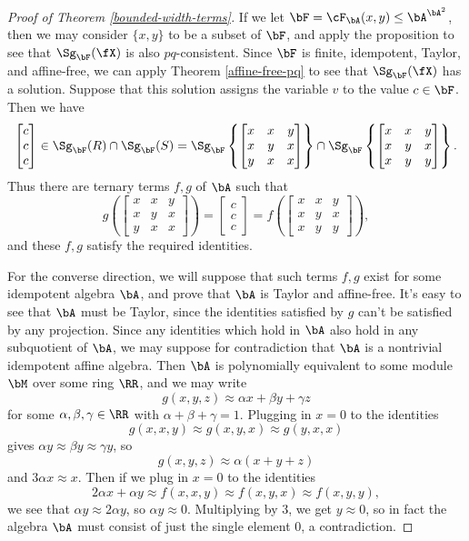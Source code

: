 \begin{proof}[Proof of Theorem \ref{bounded-width-terms}]
If we let $\bF = \cF_{\bA}(x,y) \le \bA^{\bA^2}$, then we may consider $\{x,y\}$ to be a subset of $\bF$, and apply the proposition to see that $\Sg_\bF(\fX)$ is also $pq$-consistent. Since $\bF$ is finite, idempotent, Taylor, and affine-free, we can apply Theorem \ref{affine-free-pq} to see that $\Sg_\bF(\fX)$ has a solution. Suppose that this solution assigns the variable $v$ to the value $c \in \bF$. Then we have
\[
\begin{bmatrix} c\\ c\\ c\end{bmatrix} \in \Sg_\bF(R) \cap \Sg_\bF(S) = \Sg_\bF\left\{\begin{bmatrix} x & x & y\\ x & y & x\\ y & x & x\end{bmatrix}\right\} \cap \Sg_\bF\left\{\begin{bmatrix} x & x & y\\ x & y & x\\ x & y & y\end{bmatrix}\right\}.
\]
Thus there are ternary terms $f,g$ of $\bA$ such that
\[
g\left(\begin{bmatrix} x & x & y\\ x & y & x\\ y & x & x\end{bmatrix}\right) = \begin{bmatrix} c\\ c\\ c\end{bmatrix} = f\left(\begin{bmatrix} x & x & y\\ x & y & x\\ x & y & y\end{bmatrix}\right),
\]
and these $f,g$ satisfy the required identities.

For the converse direction, we will suppose that such terms $f,g$ exist for some idempotent algebra $\bA$, and prove that $\bA$ is Taylor and affine-free. It's easy to see that $\bA$ must be Taylor, since the identities satisfied by $g$ can't be satisfied by any projection. Since any identities which hold in $\bA$ also hold in any subquotient of $\bA$, we may suppose for contradiction that $\bA$ is a nontrivial idempotent affine algebra. Then $\bA$ is polynomially equivalent to some module $\bM$ over some ring $\RR$, and we may write
\[
g(x,y,z) \approx \alpha x + \beta y + \gamma z
\]
for some $\alpha,\beta,\gamma \in \RR$ with $\alpha+\beta+\gamma = 1$. Plugging in $x = 0$ to the identities
\[
g(x,x,y) \approx g(x,y,x) \approx g(y,x,x)
\]
gives $\alpha y \approx \beta y \approx \gamma y$, so
\[
g(x,y,z) \approx \alpha(x+y+z)
\]
and $3\alpha x \approx x$. Then if we plug in $x = 0$ to the identities
\[
2\alpha x + \alpha y \approx f(x,x,y) \approx f(x,y,x) \approx f(x,y,y),
\]
we see that $\alpha y \approx 2\alpha y$, so $\alpha y \approx 0$. Multiplying by $3$, we get $y \approx 0$, so in fact the algebra $\bA$ must consist of just the single element $0$, a contradiction.
\end{proof}

